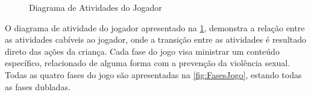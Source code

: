 \documentclass[alpha-refs,brazilian]{RBCA_v2.0}
\begin{document}
\begin{figure}[h]
  \centering
  \caption{Diagrama de Atividades do Jogador \citep{diocesano2018jogo}} 
  \label{fig:DiagramaJogar}
\end{figure}

\pagebreak

O diagrama de atividade do jogador apresentado na \cref{fig:DiagramaJogar}, demonstra a relação entre as atividades cabíveis ao jogador, onde a transição entre as atividades é resultado direto das ações da criança. Cada fase do jogo visa ministrar um conteúdo específico, relacionado de alguma forma com a prevenção da violência sexual. Todas as quatro fases do jogo são apresentadas na \cref{fig:FasesJogo}, estando todas as fases dubladas.
\end{document}
